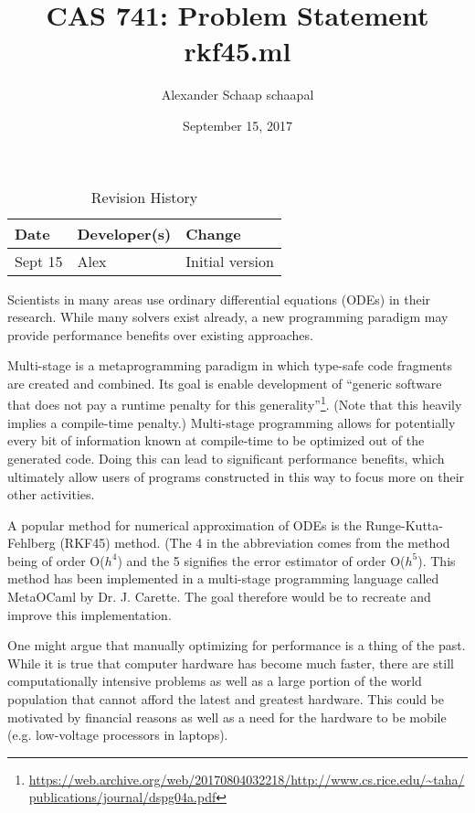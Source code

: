 \documentclass{article}
\title{CAS 741: Problem Statement\\rkf45.ml}
\author{Alexander Schaap schaapal}
\date{September 15, 2017}
\begin{document}
\maketitle

\begin{table}[hp]
\caption{Revision History} \label{TblRevisionHistory}
\begin{tabularx}{\textwidth}{llX}
\toprule
\textbf{Date} & \textbf{Developer(s)} & \textbf{Change}\\
\midrule
Sept 15 & Alex & Initial version\\
\bottomrule
\end{tabularx}
\end{table}

%
%
%

Scientists in many areas use ordinary differential equations (ODEs) in their research.
While many solvers exist already, a new programming paradigm may provide performance benefits over existing approaches.

Multi-stage is a metaprogramming paradigm in which type-safe code fragments are created and combined.
Its goal is enable development of ``generic software that does not pay a runtime penalty for this generality''\footnote{\url{https://web.archive.org/web/20170804032218/http://www.cs.rice.edu/~taha/publications/journal/dspg04a.pdf}}.
(Note that this heavily implies a compile-time penalty.)
Multi-stage programming allows for potentially every bit of information known at compile-time to be optimized out of the generated code.
Doing this can lead to significant performance benefits, which ultimately allow users of programs constructed in this way to focus more on their other activities.

A popular method for numerical approximation of ODEs is the Runge-Kutta-Fehlberg (RKF45) method.
(The 4 in the abbreviation comes from the method being of order O($h^4$) and the 5 signifies the error estimator of order O($h^5$).
This method has been implemented in a multi-stage programming language called
MetaOCaml by Dr. J. Carette. 
The goal therefore would be to recreate and improve this implementation.

One might argue that manually optimizing for performance is a thing of the past.
While it is true that computer hardware has become much faster, there are still computationally intensive problems as well as a large portion of the world population that cannot afford the latest and greatest hardware.
This could be motivated by financial reasons as well as a need for the hardware to be mobile (e.g. low-voltage processors in laptops).
\end{document}

